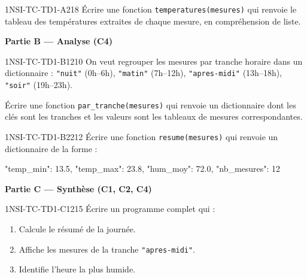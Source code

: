 \begin{exercice}{1NSI-TC-TD1-A2}{1}{8}
Écrire une fonction \lstinline{temperatures(mesures)} qui renvoie le tableau
des températures extraites de chaque mesure, en compréhension de liste.
\end{exercice}

\textbf{Partie B --- Analyse (C4)}

\begin{exercice}{1NSI-TC-TD1-B1}{2}{10}
On veut regrouper les mesures par tranche horaire dans un dictionnaire :
\lstinline{"nuit"} (0h--6h), \lstinline{"matin"} (7h--12h),
\lstinline{"apres-midi"} (13h--18h), \lstinline{"soir"} (19h--23h).

Écrire une fonction \lstinline{par_tranche(mesures)} qui renvoie un
dictionnaire dont les clés sont les tranches et les valeurs sont les
tableaux de mesures correspondantes.
\end{exercice}

\begin{exercice}{1NSI-TC-TD1-B2}{2}{12}
Écrire une fonction \lstinline{resume(mesures)} qui renvoie un dictionnaire
de la forme :
\begin{python}
{"temp_min": 13.5, "temp_max": 23.8,
 "hum_moy": 72.0, "nb_mesures": 12}
\end{python}
\end{exercice}


\textbf{Partie C --- Synthèse (C1, C2, C4)}

\begin{exercice}{1NSI-TC-TD1-C1}{2}{15}
Écrire un programme complet qui :
\begin{enumerate}
  \item Calcule le résumé de la journée.
  \item Affiche les mesures de la tranche \lstinline{"apres-midi"}.
  \item Identifie l'heure la plus humide.
\end{enumerate}
\end{exercice}
